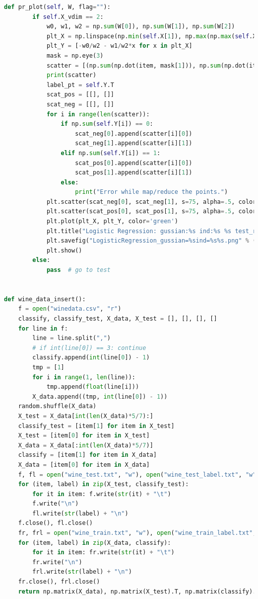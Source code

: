 \documentclass{article}
\begin{document}
\begin{lstlisting}[language={Python},title={hyperparams.py}]
    def pr_plot(self, W, flag=""):
        if self.X_vdim == 2:
            w0, w1, w2 = np.sum(W[0]), np.sum(W[1]), np.sum(W[2])
            plt_X = np.linspace(np.min(self.X[1]), np.max(np.max(self.X[2])))
            plt_Y = [-w0/w2 - w1/w2*x for x in plt_X]
            mask = np.eye(3)
            scatter = [(np.sum(np.dot(item, mask[1])), np.sum(np.dot(item, mask[2]))) for item in self.X_data]
            print(scatter)
            label_pt = self.Y.T
            scat_pos = [[], []]
            scat_neg = [[], []]
            for i in range(len(scatter)):
                if np.sum(self.Y[i]) == 0:
                    scat_neg[0].append(scatter[i][0])
                    scat_neg[1].append(scatter[i][1])
                elif np.sum(self.Y[i]) == 1:
                    scat_pos[0].append(scatter[i][0])
                    scat_pos[1].append(scatter[i][1])
                else:
                    print("Error while map/reduce the points.")
            plt.scatter(scat_neg[0], scat_neg[1], s=75, alpha=.5, color='purple')
            plt.scatter(scat_pos[0], scat_pos[1], s=75, alpha=.5, color='orange')
            plt.plot(plt_X, plt_Y, color='green')
            plt.title("Logistic Regression: gussian:%s ind:%s %s test_res:%f" % (str(self.gussian), str(self.xvalue_independent), flag, self.test(W)))
            plt.savefig("LogisticRegression_gussian=%sind=%s%s.png" % (str(self.gussian), str(self.xvalue_independent), flag))
            plt.show()
        else:
            pass  # go to test


def wine_data_insert():
    f = open("winedata.csv", "r")
    classify, classify_test, X_data, X_test = [], [], [], []
    for line in f:
        line = line.split(",")
        # if int(line[0]) == 3: continue
        classify.append(int(line[0]) - 1)
        tmp = [1]
        for i in range(1, len(line)):
            tmp.append(float(line[i]))
        X_data.append((tmp, int(line[0]) - 1))
    random.shuffle(X_data)
    X_test = X_data[int(len(X_data)*5/7):]
    classify_test = [item[1] for item in X_test]
    X_test = [item[0] for item in X_test]
    X_data = X_data[:int(len(X_data)*5/7)]
    classify = [item[1] for item in X_data]
    X_data = [item[0] for item in X_data]
    f, fl = open("wine_test.txt", "w"), open("wine_test_label.txt", "w")
    for (item, label) in zip(X_test, classify_test):
        for it in item: f.write(str(it) + "\t")
        f.write("\n")
        fl.write(str(label) + "\n")
    f.close(), fl.close()
    fr, frl = open("wine_train.txt", "w"), open("wine_train_label.txt", "w")
    for (item, label) in zip(X_data, classify):
        for it in item: fr.write(str(it) + "\t")
        fr.write("\n")
        frl.write(str(label) + "\n")
    fr.close(), frl.close()
    return np.matrix(X_data), np.matrix(X_test).T, np.matrix(classify).T, np.matrix(classify_test).T



\end{lstlisting}
\end{document}
